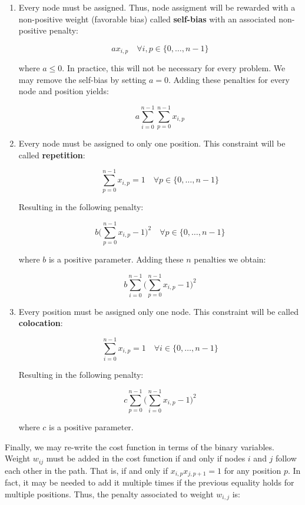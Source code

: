 \begin{enumerate}
	\item Every node must be assigned. Thus, node assigment will be rewarded with a non-positive weight (favorable bias) called \textbf{self-bias} with an associated non-positive penalty:
	
	$$ a x_{i,p} \quad \forall i,p \in \{0, \ldots, n-1\} $$
	
	where $a \leq 0$. In practice, this will not be necessary for every problem. We may remove the self-bias by setting $a=0$. Adding these penalties for every node and position yields:
	
	\begin{equation}
		\label{eqn:salesman-constrain1}
		a \sum_{i=0}^{n-1} \sum_{p=0}^{n-1} x_{i,p}
	\end{equation}
	
	\item Every node must be assigned to only one position. This constraint will be called \textbf{repetition}:
	
	$$ \sum_{p=0}^{n-1} x_{i,p} = 1 \quad \forall p \in \{0, \ldots, n-1\} $$
	
	Resulting in the following penalty:
	
	$$ b \Big( \sum_{p=0}^{n-1} x_{i,p} - 1 \Big)^2 \quad \forall p \in \{0, \ldots, n-1\} $$

	where $b$ is a positive parameter. Adding these $n$ penalties we obtain:
	
	\begin{equation}
		\label{eqn:salesman-constrain2}
		b \sum_{i=0}^{n-1} \Big( \sum_{p=0}^{n-1} x_{i,p} - 1 \Big)^2
	\end{equation}
		
	\item Every position must be assigned only one node. This constraint will be called \textbf{colocation}:
	
	$$ \sum_{i=0}^{n-1} x_{i,p} = 1 \quad \forall i \in \{0, \ldots, n-1\} $$
	
	Resulting in the following penalty:
	
	\begin{equation}
		\label{eqn:salesman-constrain3}
		c \sum_{p=0}^{n-1} \Big( \sum_{i=0}^{n-1} x_{i,p} - 1 \Big)^2
	\end{equation}
	
	where $c$ is a positive parameter.	
\end{enumerate}

Finally, we may re-write the cost function in terms of the binary variables. Weight $w_{ij}$ must be added in the cost function if and only if nodes $i$ and $j$ follow each other in the path. That is, if and only if $x_{i,p}x_{j,p+1} = 1$ for any position $p$. In fact, it may be needed to add it multiple times if the previous equality holds for multiple positions. Thus, the penalty associated to weight $w_{i,j}$ is:

